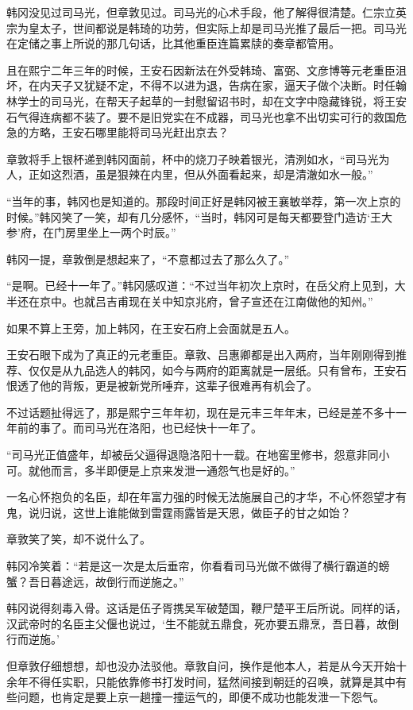 韩冈没见过司马光，但章敦见过。司马光的心术手段，他了解得很清楚。仁宗立英宗为皇太子，世间都说是韩琦的功劳，但实际上却是司马光推了最后一把。司马光在定储之事上所说的那几句话，比其他重臣连篇累牍的奏章都管用。

且在熙宁二年三年的时候，王安石因新法在外受韩琦、富弼、文彦博等元老重臣沮坏，在内天子又犹疑不定，不得不以进为退，告病在家，逼天子做个决断。时任翰林学士的司马光，在帮天子起草的一封慰留诏书时，却在文字中隐藏锋锐，将王安石气得连病都不装了。要不是旧党实在不成器，司马光也拿不出切实可行的救国危急的方略，王安石哪里能将司马光赶出京去？

章敦将手上银杯递到韩冈面前，杯中的烧刀子映着银光，清洌如水，“司马光为人，正如这烈酒，虽是狠辣在内里，但从外面看起来，却是清澈如水一般。”

“当年的事，韩冈也是知道的。那段时间正好是韩冈被王襄敏举荐，第一次上京的时候。”韩冈笑了一笑，却有几分感怀，“当时，韩冈可是每天都要登门造访‘王大参’府，在门房里坐上一两个时辰。”

韩冈一提，章敦倒是想起来了，“不意都过去了那么久了。”

“是啊。已经十一年了。”韩冈感叹道：“不过当年初次上京时，在岳父府上见到，大半还在京中。也就吕吉甫现在关中知京兆府，曾子宣还在江南做他的知州。”

如果不算上王旁，加上韩冈，在王安石府上会面就是五人。

王安石眼下成为了真正的元老重臣。章敦、吕惠卿都是出入两府，当年刚刚得到推荐、仅仅是从九品选人的韩冈，如今与两府的距离就是一层纸。只有曾布，王安石恨透了他的背叛，更是被新党所唾弃，这辈子很难再有机会了。

不过话题扯得远了，那是熙宁三年年初，现在是元丰三年年末，已经是差不多十一年前的事了。而司马光在洛阳，也已经快十一年了。

“司马光正值盛年，却被岳父逼得退隐洛阳十一载。在地窖里修书，怨意非同小可。就他而言，多半即便是上京来发泄一通怨气也是好的。”

一名心怀抱负的名臣，却在年富力强的时候无法施展自己的才华，不心怀怨望才有鬼，说归说，这世上谁能做到雷霆雨露皆是天恩，做臣子的甘之如饴？

章敦笑了笑，却不说什么了。

韩冈冷笑着：“若是这一次是太后垂帘，你看看司马光做不做得了横行霸道的螃蟹？吾日暮途远，故倒行而逆施之。”

韩冈说得刻毒入骨。这话是伍子胥携吴军破楚国，鞭尸楚平王后所说。同样的话，汉武帝时的名臣主父偃也说过，‘生不能就五鼎食，死亦要五鼎烹，吾日暮，故倒行而逆施。’

但章敦仔细想想，却也没办法驳他。章敦自问，换作是他本人，若是从今天开始十余年不得任实职，只能依靠修书打发时间，猛然间接到朝廷的召唤，就算是其中有些问题，也肯定是要上京一趟撞一撞运气的，即便不成功也能发泄一下怨气。

